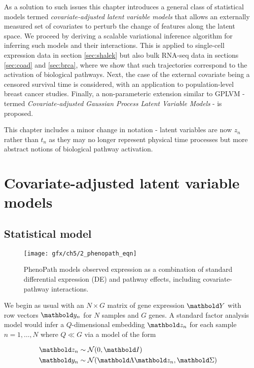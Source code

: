 As a solution to such issues this chapter introduces a general class of statistical models termed \emph{covariate-adjusted latent variable models} that allows an externally measured set of covariates to perturb the change of features along the latent space. We proceed by deriving a scalable variational inference algorithm for inferring such models and their interactions. This is applied to single-cell expression data in section \ref{sec:shalek} but also bulk RNA-seq data in sections \ref{sec:coad} and \ref{sec:brca}, where we show that such trajectories correspond to the activation of biological pathways. Next, the case of the external covariate being a censored survival time is considered, with an application to population-level breast cancer studies. Finally, a non-parameteric extension similar to GPLVM - termed \emph{Covariate-adjusted Gaussian Process Latent Variable Models} - is proposed.

This chapter includes a minor change in notation - latent variables are now $z_n$ rather than $t_n$ as they may no longer represent physical time processes but more abstract notions of biological pathway activation.

\section{Covariate-adjusted latent variable models}

\subsection{Statistical model}

\begin{figure}
\centering
  \texttt{[image: gfx/ch5/2\_phenopath\_eqn]}
  \caption{PhenoPath models observed expression as a combination of standard differential expression (DE) and pathway effects, including covariate-pathway interactions.
  } \label{fig:phenopath_eqn}
\end{figure}

We begin as usual with an $N \times G$ matrix of gene expression $\mbY$ with row vectors $\mby_n$ for $N$ samples and $G$ genes. A standard factor analysis model would infer a $Q$-dimensional embedding $\mbz_n$ for each sample $n = 1, \ldots, N$ where $Q \ll G$ via a model of the form

\begin{equation}
  \begin{aligned}
\mbz_n & \sim \Norm(0, \mbI) \\
\mby_n & \sim \Norm(\mbLambda \mbz_n, \mbSigma)
  \end{aligned}
\end{equation}

